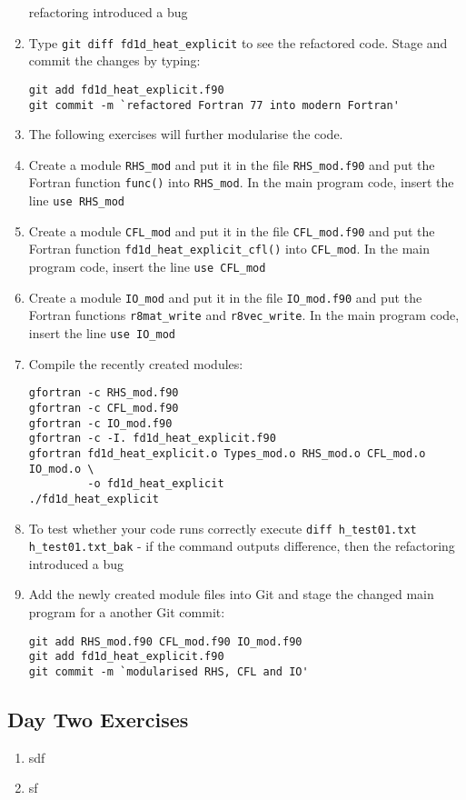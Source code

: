 \documentclass[12pt]{article}
\begin{document}
\begin{enumerate}
refactoring introduced a bug
\item Type \texttt{git diff fd1d\_heat\_explicit} to see the refactored code. Stage and commit
the changes by typing: 
\begin{verbatim}
git add fd1d_heat_explicit.f90
git commit -m `refactored Fortran 77 into modern Fortran'
\end{verbatim}
\item[] The following exercises will further modularise the code. 
\item Create a module \texttt{RHS\_mod} and put it in the file \texttt{RHS\_mod.f90} and put the 
Fortran function \texttt{func()} into \texttt{RHS\_mod}. In the main program code, 
insert the line \texttt{use RHS\_mod} 
\item Create a module \texttt{CFL\_mod} and put it in the file \texttt{CFL\_mod.f90} and put the
Fortran function \texttt{fd1d\_heat\_explicit\_cfl()} into \texttt{CFL\_mod}. In the main program
code, insert the line \texttt{use CFL\_mod}
\item Create a module \texttt{IO\_mod} and put it in the file \texttt{IO\_mod.f90} and put
the Fortran functions \texttt{r8mat\_write} and \texttt{r8vec\_write}. In the main program code, 
insert the line \texttt{use IO\_mod}
\item Compile the recently created modules:
\begin{verbatim}
gfortran -c RHS_mod.f90
gfortran -c CFL_mod.f90
gfortran -c IO_mod.f90
gfortran -c -I. fd1d_heat_explicit.f90
gfortran fd1d_heat_explicit.o Types_mod.o RHS_mod.o CFL_mod.o IO_mod.o \
         -o fd1d_heat_explicit
./fd1d_heat_explicit
\end{verbatim}
\item To test whether your code runs correctly execute\newline
\texttt{diff h\_test01.txt h\_test01.txt\_bak} - if the command outputs difference, then the 
refactoring introduced a bug
\item Add the newly created module files into Git and stage the changed main program for a
another Git commit:
\begin{verbatim}
git add RHS_mod.f90 CFL_mod.f90 IO_mod.f90
git add fd1d_heat_explicit.f90
git commit -m `modularised RHS, CFL and IO'
\end{verbatim}
%
\end{enumerate}
\newpage
\subsection*{Day Two Exercises}
\begin{enumerate}
\item sdf
\item sf
\end{enumerate}
\end{document}
